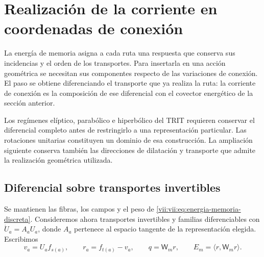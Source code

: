 
\section{Realización de la corriente en coordenadas de conexión}
\label{vii:vii:sec:composicion-corriente-conexion}

La energía de memoria asigna a cada ruta una respuesta que conserva sus
incidencias y el orden de los transportes. Para insertarla en una acción
geométrica se necesitan sus componentes respecto de las variaciones de
conexión. El paso se obtiene diferenciando el transporte que ya realiza
la ruta: la corriente de conexión es la composición de ese diferencial
con el covector energético de la sección anterior.

Los regímenes elíptico, parabólico e hiperbólico del TRIT requieren
conservar el diferencial completo antes de restringirlo a una
representación particular. Las rotaciones unitarias constituyen un
dominio de esa construcción. La ampliación siguiente conserva también
las direcciones de dilatación y transporte que admite la realización
geométrica utilizada.

\subsection{Diferencial sobre transportes invertibles}

Se mantienen las fibras, los campos y el peso de
\eqref{vii:vii:eq:energia-memoria-discreta}. Consideremos ahora transportes
invertibles y familias diferenciables con
\(\dot U_a=A_aU_a\), donde \(A_a\) pertenece al espacio tangente
de la representación elegida. Escribimos
\[
 v_a=U_af_{s(a)},\qquad r_a=f_{t(a)}-v_a,\qquad
 q=\mathsf W_mr,\qquad E_m=\langle r,\mathsf W_mr\rangle.
\]

